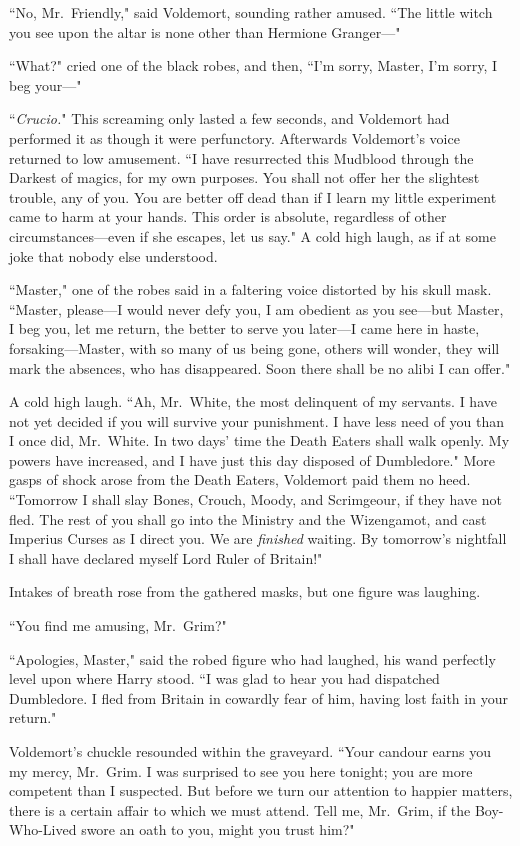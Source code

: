 ``No, Mr.~Friendly," said Voldemort, sounding rather amused. ``The little witch you see upon the altar is none other than Hermione Granger—"

``What?" cried one of the black robes, and then, ``I'm sorry, Master, I'm sorry, I beg your—"

``\emph{Crucio.}" This screaming only lasted a few seconds, and Voldemort had performed it as though it were perfunctory. Afterwards Voldemort's voice returned to low amusement. ``I have resurrected this Mudblood through the Darkest of magics, for my own purposes. You shall not offer her the slightest trouble, any of you. You are better off dead than if I learn my little experiment came to harm at your hands. This order is absolute, regardless of other circumstances—even if she escapes, let us say." A cold high laugh, as if at some joke that nobody else understood.

``Master," one of the robes said in a faltering voice distorted by his skull mask. ``Master, please—I would never defy you, I am obedient as you see—but Master, I beg you, let me return, the better to serve you later—I came here in haste, forsaking—Master, with so many of us being gone, others will wonder, they will mark the absences, who has disappeared. Soon there shall be no alibi I can offer."

A cold high laugh. ``Ah, Mr.~White, the most delinquent of my servants. I have not yet decided if you will survive your punishment. I have less need of you than I once did, Mr.~White. In two days' time the Death Eaters shall walk openly. My powers have increased, and I have just this day disposed of Dumbledore." More gasps of shock arose from the Death Eaters, Voldemort paid them no heed. ``Tomorrow I shall slay Bones, Crouch, Moody, and Scrimgeour, if they have not fled. The rest of you shall go into the Ministry and the Wizengamot, and cast Imperius Curses as I direct you. We are \emph{finished} waiting. By tomorrow's nightfall I shall have declared myself Lord Ruler of Britain!"

Intakes of breath rose from the gathered masks, but one figure was laughing.

``You find me amusing, Mr.~Grim?"

``Apologies, Master," said the robed figure who had laughed, his wand perfectly level upon where Harry stood. ``I was glad to hear you had dispatched Dumbledore. I fled from Britain in cowardly fear of him, having lost faith in your return."

Voldemort's chuckle resounded within the graveyard. ``Your candour earns you my mercy, Mr.~Grim. I was surprised to see you here tonight; you are more competent than I suspected. But before we turn our attention to happier matters, there is a certain affair to which we must attend. Tell me, Mr.~Grim, if the Boy-Who-Lived swore an oath to you, might you trust him?"

